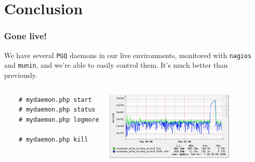 \documentclass{beamer}
\begin{document}
\section{Conclusion}

\begin{frame}[fragile]
  \frametitle{Gone live!}

  We have several \texttt{PGQ} daemons in our live environments, monitored
  with \texttt{nagios} and \texttt{munin}, and we're able to easily control
  them. It's much better than previously.

  \pause

\begin{columns}[c]
  \begin{example}
  \begin{verbatim}
    # mydaemon.php start
    # mydaemon.php status
    # mydaemon.php logmore

    # mydaemon.php kill
  \end{verbatim}
  \end{example}
\begin{center} 
\includegraphics[height=1.3in]{pgq.png}
\end{center} 
\end{columns}
\end{frame}
\end{document}
